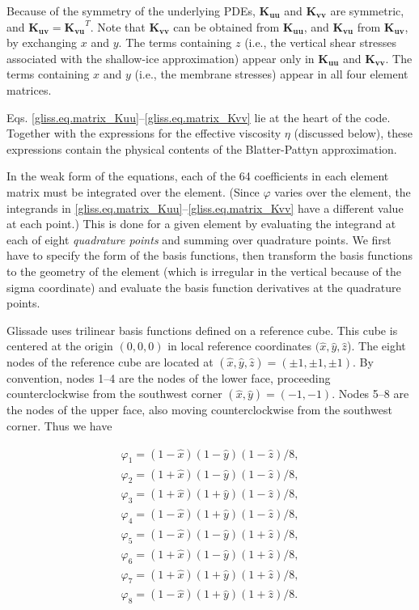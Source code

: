 Because of the symmetry of the underlying PDEs, $\mathbf{K_{uu}}$ and $\mathbf{K_{vv}}$ are symmetric,
and $\mathbf{K_{uv}} = \mathbf{K_{vu}}^{T}$.  Note that $\mathbf{K_{vv}}$ can be obtained from $\mathbf{K_{uu}}$, 
and $\mathbf{K_{vu}}$ from $\mathbf{K_{uv}}$, by exchanging $x$ and $y$.  The terms
containing $z$ (i.e., the vertical shear stresses associated with the shallow-ice approximation)
appear only in $\mathbf{K_{uu}}$ and $\mathbf{K_{vv}}$.  The terms containing $x$ and $y$ (i.e.,
the membrane stresses) appear in all four element matrices.

Eqs. \eqref{gliss.eq.matrix_Kuu}--\eqref{gliss.eq.matrix_Kvv} lie at the heart of the code. 
Together with the expressions for the effective viscosity $\eta$ (discussed below),
these expressions contain the physical contents of the Blatter-Pattyn approximation. 

In the weak form of the equations, each of the 64 coefficients in each
element matrix must be integrated over the element.  (Since $\varphi$ varies over the element,
the integrands in \eqref{gliss.eq.matrix_Kuu}--\eqref{gliss.eq.matrix_Kvv} 
have a different value at each point.)  
This is done for a given element by evaluating the integrand at each of 
eight \textit{quadrature points} and summing over quadrature points.
We first have to specify the form of the basis functions, then transform the basis functions to
the geometry of the element (which is irregular in the vertical because of the sigma
coordinate) and evaluate the basis function derivatives at the quadrature points.

Glissade uses trilinear basis functions defined on a reference cube.  
This cube is centered at the origin $(0,0,0)$ in local reference coordinates 
$(\hat{x}, \hat{y}, \hat{z}$). 
The eight nodes of the reference cube are located at $(\hat{x}, \hat{y}, \hat{z}) = (\pm 1, \pm 1, \pm 1)$.
By convention, nodes 1--4 are the nodes of the lower face, proceeding counterclockwise
from the southwest corner $(\hat{x}, \hat{y}) = (-1, -1)$. Nodes 5--8 are the nodes
of the upper face, also moving counterclockwise from the southwest corner.
Thus we have

\begin{equation}
  \label{gliss.eq.basis_functions}
  \begin{matrix}
    {{\varphi }_{1}}=(1-\hat{x})(1-\hat{y})(1-\hat{z})/8,  \\[3pt]
    {{\varphi }_{2}}=(1+\hat{x})(1-\hat{y})(1-\hat{z})/8,  \\[3pt]
    {{\varphi }_{3}}=(1+\hat{x})(1+\hat{y})(1-\hat{z})/8,  \\[3pt]
    {{\varphi }_{4}}=(1-\hat{x})(1+\hat{y})(1-\hat{z})/8,  \\[3pt]
    {{\varphi }_{5}}=(1-\hat{x})(1-\hat{y})(1+\hat{z})/8,  \\[3pt]
    {{\varphi }_{6}}=(1+\hat{x})(1-\hat{y})(1+\hat{z})/8,  \\[3pt]
    {{\varphi }_{7}}=(1+\hat{x})(1+\hat{y})(1+\hat{z})/8,  \\[3pt]
    {{\varphi }_{8}}=(1-\hat{x})(1+\hat{y})(1+\hat{z})/8.  \\
  \end{matrix}
\end{equation} 

